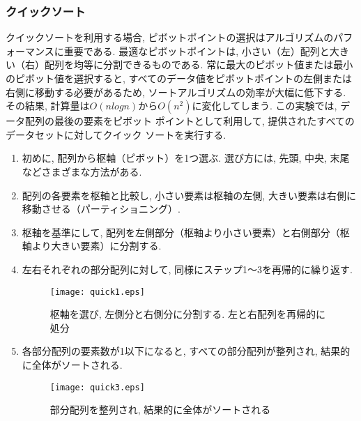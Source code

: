 \documentclass[a4j, 11pt]{jarticle}
\begin{document}
\subsubsection{クイックソート}
クイックソートを利用する場合, ピボットポイントの選択はアルゴリズムのパフォーマンスに重要である. 最適なピボットポイントは, 小さい（左）配列と大きい（右）配列を均等に分割できるものである. 常に最大のピボット値または最小のピボット値を選択すると, すべてのデータ値をピボットポイントの左側または右側に移動する必要があるため, ソートアルゴリズムの効率が大幅に低下する. その結果, 計算量は$O(nlogn)$から$O(n^2)$に変化してしまう\cite{gfg:quicksort2025}. この実験では, データ配列の最後の要素をピボット ポイントとして利用して, 提供されたすべてのデータセットに対してクイック ソートを実行する. \\
\begin{enumerate}
  \item 初めに, 配列から枢軸（ピボット）を1つ選ぶ. 選び方には, 先頭, 中央, 末尾などさまざまな方法がある. 
  \item 配列の各要素を枢軸と比較し, 小さい要素は枢軸の左側, 大きい要素は右側に移動させる（パーティショニング）. 
  \item 枢軸を基準にして, 配列を左側部分（枢軸より小さい要素）と右側部分（枢軸より大きい要素）に分割する. 
  \item 左右それぞれの部分配列に対して, 同様にステップ1～3を再帰的に繰り返す. 
  \begin{figure}[H]
    \centering
    \texttt{[image: quick1.eps]}
    \caption{枢軸を選び, 左側分と右側分に分割する. 左と右配列を再帰的に処分}
  \end{figure}
  \item 各部分配列の要素数が1以下になると, すべての部分配列が整列され, 結果的に全体がソートされる. 
  \begin{figure}[H]
    \centering
    \texttt{[image: quick3.eps]}
    \caption{部分配列を整列され, 結果的に全体がソートされる}
  \end{figure}
\end{enumerate}
\end{document}
